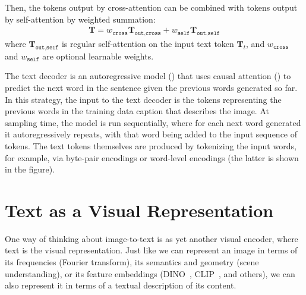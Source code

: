 Then, the tokens output by cross-attention can be combined with tokens output by self-attention by weighted summation:
\begin{align}
    \mathbf{T} = w_{\texttt{cross}}\mathbf{T}_{\texttt{out}, \texttt{cross}}  + w_{\texttt{self}}\mathbf{T}_{\texttt{out}, \texttt{self}}
\end{align}
where $\mathbf{T}_{\texttt{out}, \texttt{self}}$ is regular self-attention on the input text token $\mathbf{T}_t$, and $w_{\texttt{cross}}$ and $w_{\texttt{self}}$ are optional learnable weights.

The text decoder is an autoregressive model (\sect{\ref{sec:generative_models:autoregressive}}) that uses causal attention (\sect{\ref{sec:transformers:masked_attention}}) to predict the next word in the sentence given the previous words generated so far. In this strategy, the input to the text decoder is the tokens representing the previous words in the training data caption that describes the image. At sampling time, the model is run sequentially, where for each next word generated it autoregressively repeats, with that word being added to the input sequence of tokens. The text tokens themselves are produced by tokenizing the input words, for example, via byte-pair encodings or word-level encodings (the latter is shown in the figure).

\section{Text as a Visual Representation}

One way of thinking about image-to-text is as yet another visual encoder, where text is the visual representation. Just like we can represent an image in terms of its frequencies (Fourier transform), its semantics and geometry (scene understanding), or its feature embeddings (DINO~\cite{caron2021emerging}, CLIP~\cite{radford2021learning}, and others), we can also represent it in terms of a textual description of its content.



